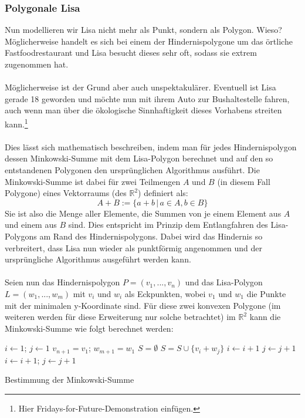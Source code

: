 \documentclass[a4paper, notitlepage, 12pt]{scrartcl}
\begin{document}
  \subsubsection{Polygonale Lisa}
 Nun modellieren wir Lisa nicht mehr als Punkt, sondern als Polygon. Wieso? Möglicherweise handelt es sich bei einem der Hindernispolygone um das örtliche Fastfoodrestaurant und Lisa besucht dieses sehr oft, sodass sie extrem zugenommen hat. \\ \\
 Möglicherweise ist der Grund aber auch unspektakulärer. Eventuell ist Lisa gerade 18 geworden und möchte nun mit ihrem Auto zur Bushaltestelle fahren, auch wenn man über die ökologische Sinnhaftigkeit dieses Vorhabens streiten kann.\footnote{Hier Fridays-for-Future-Demonstration einfügen.} \\ \\
 Dies lässt sich mathematisch beschreiben, indem man für jedes Hindernispolygon dessen Minkowski-Summe mit dem Lisa-Polygon berechnet und auf den so entstandenen Polygonen den ursprünglichen Algorithmus ausführt. Die Minkowski-Summe ist dabei für zwei Teilmengen $A$ und $B$ (in diesem Fall Polygone) eines Vektorraums (des $\mathbb{R}^{2}$) definiert als:
 \begin{equation}
 A + B := \{a+b\,|\,a \in A, b \in B\}
 \end{equation}
 Sie ist also die Menge aller Elemente, die Summen von je einem Element aus $A$ und einem aus $B$ sind.\cite{Src:minkowski} Dies entspricht im Prinzip dem Entlangfahren des Lisa-Polygons am Rand des Hindernispolygons. Dabei wird das Hindernis so verbreitert, dass Lisa nun wieder als punktförmig angenommen und der ursprüngliche Algorithmus ausgeführt werden kann. \\ \\
 Seien nun das Hindernispolygon $P = (v_1,...,v_n)$ und das Lisa-Polygon $L = (w_1,...,w_m)$ mit $v_i$ und $w_i$ als Eckpunkten, wobei $v_1$ und $w_1$ die Punkte mit der minimalen y-Koordinate sind. Für diese zwei konvexen Polygone (im weiteren werden für diese Erweiterung nur solche betrachtet) im $\mathbb{R}^{2}$ kann die Minkowski-Summe wie folgt berechnet werden:
 \begin{algorithm}[H]
\begin{algorithmic}
	\State $i \gets 1$; $j \gets 1$
	\State $v_{n+1} = v_1$; $w_{m+1} = w_1$
	\State $S = \emptyset$ 
	\Repeat
	\State $S = S \cup \{v_i + w_j\}$
	\State $i \gets i + 1$
	\EndIf
	\State $j \gets j + 1$
	\EndIf
	\State $i \gets i + 1$; $j \gets j + 1$
	\EndIf
	\EndFunction
\end{algorithmic}
\caption{Bestimmung der Minkowski-Summe}
\end{algorithm}
\end{document}
